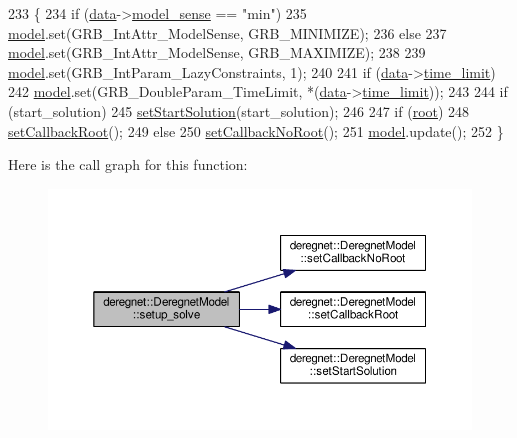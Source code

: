 \begin{DoxyCode}
233                                                                                         \{
234     \textcolor{keywordflow}{if} (\hyperlink{classderegnet_1_1DeregnetModel_ad5399761cf6293a702f3800bda4806d1}{data}->\hyperlink{classderegnet_1_1DeregnetData_ac3918536b5423facf0ac155997703c52}{model\_sense} == \textcolor{stringliteral}{"min"})
235         \hyperlink{classderegnet_1_1DeregnetModel_a30d525de2086e342b33fe3e45ede4947}{model}.set(GRB\_IntAttr\_ModelSense, GRB\_MINIMIZE);
236     \textcolor{keywordflow}{else}
237         \hyperlink{classderegnet_1_1DeregnetModel_a30d525de2086e342b33fe3e45ede4947}{model}.set(GRB\_IntAttr\_ModelSense, GRB\_MAXIMIZE);
238 
239     \hyperlink{classderegnet_1_1DeregnetModel_a30d525de2086e342b33fe3e45ede4947}{model}.set(GRB\_IntParam\_LazyConstraints, 1);
240 
241     \textcolor{keywordflow}{if} (\hyperlink{classderegnet_1_1DeregnetModel_ad5399761cf6293a702f3800bda4806d1}{data}->\hyperlink{classderegnet_1_1DeregnetData_ac378faf7e8466135b8dc0ced907d98ae}{time\_limit})
242         \hyperlink{classderegnet_1_1DeregnetModel_a30d525de2086e342b33fe3e45ede4947}{model}.set(GRB\_DoubleParam\_TimeLimit, *(\hyperlink{classderegnet_1_1DeregnetModel_ad5399761cf6293a702f3800bda4806d1}{data}->\hyperlink{classderegnet_1_1DeregnetData_ac378faf7e8466135b8dc0ced907d98ae}{time\_limit}));
243 
244     \textcolor{keywordflow}{if} (start\_solution)
245         \hyperlink{classderegnet_1_1DeregnetModel_a7a76da5bb39123d94c57ba2c940cb1c2}{setStartSolution}(start\_solution);
246 
247     \textcolor{keywordflow}{if} (\hyperlink{classderegnet_1_1DeregnetModel_a54b20393a0e26d65935d387685d7fe96}{root})
248         \hyperlink{classderegnet_1_1DeregnetModel_a19332c492a33a1e488ed916947d38c08}{setCallbackRoot}();
249     \textcolor{keywordflow}{else}
250         \hyperlink{classderegnet_1_1DeregnetModel_a6cecefeafaf782843c91e0c55e768a94}{setCallbackNoRoot}();
251     \hyperlink{classderegnet_1_1DeregnetModel_a30d525de2086e342b33fe3e45ede4947}{model}.update();
252 \}
\end{DoxyCode}


Here is the call graph for this function\+:\nopagebreak
\begin{figure}[H]
\begin{center}
\leavevmode
\includegraphics[width=350pt]{classderegnet_1_1DeregnetModel_a502657403c84cbdc66ad845c56dee339_cgraph}
\end{center}
\end{figure}




